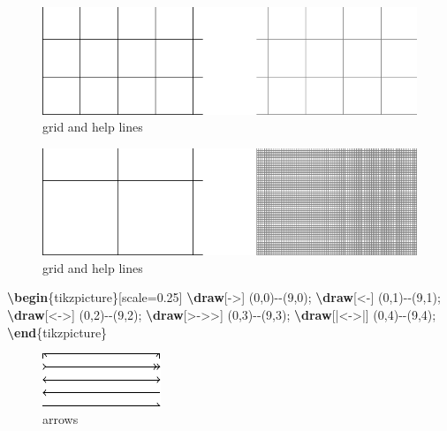 \documentclass[
]{book}
\newenvironment{Shaded}{\begin{snugshade}}{\end{snugshade}}
\newcommand{\ExtensionTok}[1]{#1}
\newcommand{\FunctionTok}[1]{\textcolor[rgb]{0.13,0.29,0.53}{\textbf{#1}}}
\newcommand{\KeywordTok}[1]{\textcolor[rgb]{0.13,0.29,0.53}{\textbf{#1}}}
\newcommand{\NormalTok}[1]{#1}
\theoremstyle{definition}
\theoremstyle{definition}
\theoremstyle{definition}
\theoremstyle{definition}
\theoremstyle{remark}
\begin{document}
\begin{figure}
\includegraphics[width=0.75\linewidth]{202401311000-TikZ_files/figure-latex/unnamed-chunk-36-1} \caption{grid and help lines}\label{fig:unnamed-chunk-36}
\end{figure}

\begin{figure}
\includegraphics[width=0.75\linewidth]{202401311000-TikZ_files/figure-latex/unnamed-chunk-37-1} \caption{grid and help lines}\label{fig:unnamed-chunk-37}
\end{figure}

\begin{Shaded}
\begin{Highlighting}[]
\KeywordTok{\textbackslash{}begin}\NormalTok{\{}\ExtensionTok{tikzpicture}\NormalTok{\}[scale=0.25]}
  \FunctionTok{\textbackslash{}draw}\NormalTok{[{-}\textgreater{}] (0,0){-}{-}(9,0);}
  \FunctionTok{\textbackslash{}draw}\NormalTok{[\textless{}{-}] (0,1){-}{-}(9,1);}
  \FunctionTok{\textbackslash{}draw}\NormalTok{[\textless{}{-}\textgreater{}] (0,2){-}{-}(9,2);}
  \FunctionTok{\textbackslash{}draw}\NormalTok{[\textgreater{}{-}\textgreater{}\textgreater{}] (0,3){-}{-}(9,3);}
  \FunctionTok{\textbackslash{}draw}\NormalTok{[|\textless{}{-}\textgreater{}|] (0,4){-}{-}(9,4);}
\KeywordTok{\textbackslash{}end}\NormalTok{\{}\ExtensionTok{tikzpicture}\NormalTok{\}}
\end{Highlighting}
\end{Shaded}

\begin{figure}
\includegraphics[width=0.75\linewidth]{202401311000-TikZ_files/figure-latex/unnamed-chunk-39-1} \caption{arrows}\label{fig:unnamed-chunk-39}
\end{figure}
\end{document}
